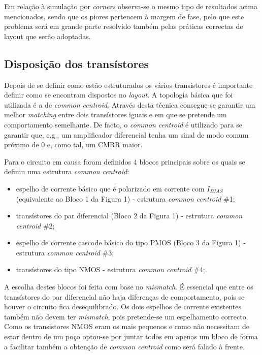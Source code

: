 \documentclass[11pt]{article}
\numberwithin{equation}{section}
\begin{document}
Em relação à simulação por \textit{corners} observa-se o mesmo tipo de resultados acima mencionados, sendo que os piores pertencem à margem de fase, pelo que este problema será em grande parte resolvido também pelas práticas correctas de layout que serão adoptadas.

\subsection{Disposição dos transístores}

Depois de se definir como estão estruturados os vários transístores é importante definir como se encontram dispostos no \textit{layout}. A topologia básica que foi utilizada é a de \textit{common centroid}. Através desta técnica consegue-se garantir um melhor \textit{matching} entre dois transístores iguais e em que se pretende um comportamento semelhante. De facto, o \textit{common centroid} é utilizado para se garantir que, e.g., um amplificador diferencial tenha um sinal de modo comum próximo de 0 e, como tal, um CMRR maior.

Para o circuito em causa foram definidos 4 blocos principais sobre os quais se definiu uma estrutura \textit{common centroid}:

\vspace{-2mm}

\begin{itemize}
	\item espelho de corrente básico que é polarizado em corrente com $I_{BIAS}$ (equivalente ao Bloco 1 da Figura 1) - estrutura \textit{common centroid} \#1;
	\vspace{-2mm}
	\item transístores do par diferencial (Bloco 2 da Figura 1) - estrutura \textit{common centroid} \#2;
	\vspace{-2mm}
	\item espelho de corrente cascode básico do tipo PMOS (Bloco 3 da Figura 1) - estrutura \textit{common centroid} \#3;
	\vspace{-2mm}
	\item transístores do tipo NMOS - estrutura \textit{common centroid} \#4;.
\end{itemize}

A escolha destes blocos foi feita com base no \textit{mismatch}. É essencial que entre os transístores do par diferencial não haja diferenças de comportamento, pois se houver o circuito fica desequilibrado. Os dois espelhos de corrente existentes também não devem ter \textit{mismatch}, pois pretende-se um espelhamento correcto. Como os transistores NMOS eram os mais pequenos e como não necessitam de estar dentro de um poço optou-se por juntar todos em apenas um bloco de forma a facilitar também a obtenção de \textit{common centroid} como será falado à frente.
\end{document}
